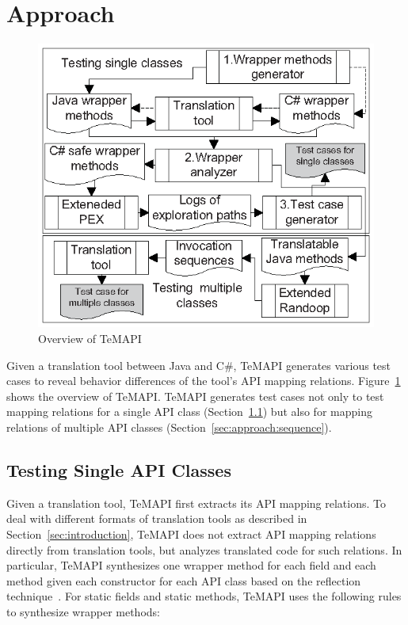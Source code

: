 \section{Approach}
\label{sec:approach}
\begin{figure}[t]
\centering
\includegraphics[scale=1,clip]{figure/approach.eps}\vspace*{-3ex}
 \caption{Overview of TeMAPI}\vspace*{-4ex}
 \label{fig:approach}
\end{figure}

Given a translation tool between Java and C\#, TeMAPI generates various test cases to reveal behavior differences of the tool's API mapping relations. Figure~\ref{fig:approach} shows the overview of TeMAPI. TeMAPI generates test cases not only to test mapping relations for a single API class (Section~\ref{sec:approach:single}) but also for mapping relations of multiple API classes (Section~\ref{sec:approach:sequence}).


\subsection{Testing Single API Classes}
\label{sec:approach:single}
Given a translation tool, TeMAPI first extracts its API mapping relations. To deal with different formats of translation tools as described in Section~\ref{sec:introduction}, TeMAPI does not extract API mapping relations directly from translation tools, but analyzes translated code for such relations. In particular, TeMAPI synthesizes one wrapper method for each field and each method given each constructor for each API class based on the reflection technique~\cite{maes1987concepts}. For static fields and static methods, TeMAPI uses the following rules to synthesize wrapper methods:

